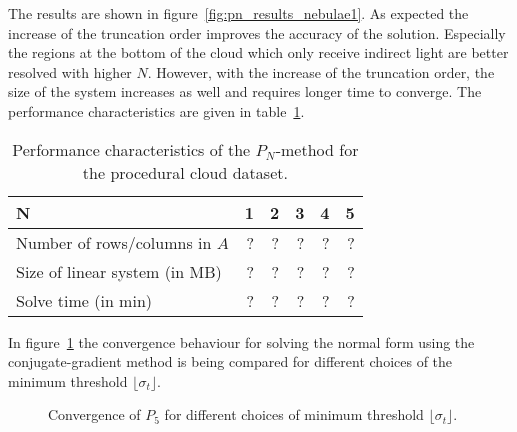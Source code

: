 The results are shown in figure~\ref{fig:pn_results_nebulae1}. As expected the increase of the truncation order improves the accuracy of the solution. Especially the regions at the bottom of the cloud which only receive indirect light are better resolved with higher $N$. However, with the increase of the truncation order, the size of the system increases as well and requires longer time to converge. The performance characteristics are given in table~\ref{tab:results_cloud}.
\begin{table}[!h]
	\centering
	\caption[table test what is this doing here?]{Performance characteristics of the $P_N$-method for the procedural cloud dataset.}
	\label{tab:results_cloud}
	\begin{tabular}{l r r r r r}
    \hline
	\textbf{N}
    & 1 & 2 & 3 & 4 & 5
    \\
    \hline
    Number of rows/columns in $A$
    & ? & ? & ? & ? & ?
    \\
    Size of linear system (in MB)
    & ? & ? & ? & ? & ?
    \\
    Solve time (in min)
    & ? & ? & ? & ? & ?
	\end{tabular}
\end{table}
In figure~\ref{fig:pn_results_convergence} the convergence behaviour for solving the normal form using the conjugate-gradient method is being compared for different choices of the minimum threshold $\lfloor\sigma_t\rfloor$.
\begin{figure}[h]
\centering
{}
\caption{Convergence of $P_5$ for different choices of minimum threshold $\lfloor\sigma_t\rfloor$.}
\label{fig:pn_results_convergence}
\end{figure}




